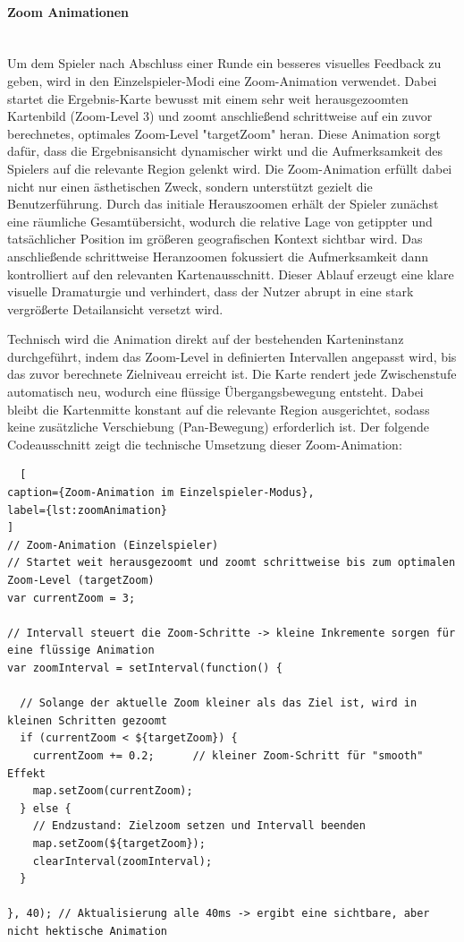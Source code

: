 \paragraph{Zoom Animationen}
\mbox{}\\
Um dem Spieler nach Abschluss einer Runde ein besseres visuelles Feedback zu geben, wird in den Einzelspieler-Modi eine Zoom-Animation verwendet. Dabei startet die Ergebnis-Karte bewusst mit einem sehr weit herausgezoomten Kartenbild (Zoom-Level 3) und zoomt anschließend schrittweise auf ein zuvor berechnetes, optimales Zoom-Level "targetZoom" heran. Diese Animation sorgt dafür, dass die Ergebnisansicht dynamischer wirkt und die Aufmerksamkeit des Spielers auf die relevante Region gelenkt wird.
Die Zoom-Animation erfüllt dabei nicht nur einen ästhetischen Zweck, sondern unterstützt gezielt die Benutzerführung. Durch das initiale Herauszoomen erhält der Spieler zunächst eine räumliche Gesamtübersicht, wodurch die relative Lage von getippter und tatsächlicher Position im größeren geografischen Kontext sichtbar wird. Das anschließende schrittweise Heranzoomen fokussiert die Aufmerksamkeit dann kontrolliert auf den relevanten Kartenausschnitt. Dieser Ablauf erzeugt eine klare visuelle Dramaturgie und verhindert, dass der Nutzer abrupt in eine stark vergrößerte Detailansicht versetzt wird.

Technisch wird die Animation direkt auf der bestehenden Karteninstanz durchgeführt, indem das Zoom-Level in definierten Intervallen angepasst wird, bis das zuvor berechnete Zielniveau erreicht ist. Die Karte rendert jede Zwischenstufe automatisch neu, wodurch eine flüssige Übergangsbewegung entsteht. Dabei bleibt die Kartenmitte konstant auf die relevante Region ausgerichtet, sodass keine zusätzliche Verschiebung (Pan-Bewegung) erforderlich ist.
Der folgende Codeausschnitt zeigt die technische Umsetzung dieser Zoom-Animation:

\begin{lstlisting}
  [
caption={Zoom-Animation im Einzelspieler-Modus},
label={lst:zoomAnimation}
] 
// Zoom-Animation (Einzelspieler)
// Startet weit herausgezoomt und zoomt schrittweise bis zum optimalen Zoom-Level (targetZoom)
var currentZoom = 3;

// Intervall steuert die Zoom-Schritte -> kleine Inkremente sorgen für eine flüssige Animation
var zoomInterval = setInterval(function() {

  // Solange der aktuelle Zoom kleiner als das Ziel ist, wird in kleinen Schritten gezoomt
  if (currentZoom < ${targetZoom}) {
    currentZoom += 0.2;      // kleiner Zoom-Schritt für "smooth" Effekt
    map.setZoom(currentZoom);
  } else {
    // Endzustand: Zielzoom setzen und Intervall beenden
    map.setZoom(${targetZoom});
    clearInterval(zoomInterval);
  }

}, 40); // Aktualisierung alle 40ms -> ergibt eine sichtbare, aber nicht hektische Animation
\end{lstlisting}

